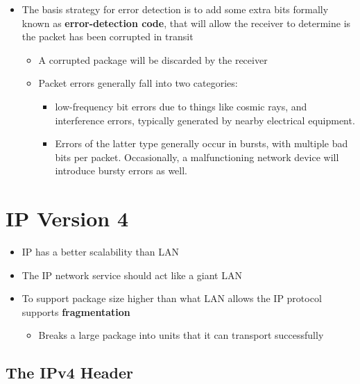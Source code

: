 \documentclass[11pt]{article}
\providecommand{\tightlist}{%
      \setlength{\itemsep}{0pt}\setlength{\parskip}{0pt}}
\begin{document}
\begin{itemize}
\tightlist
\item
  The basis strategy for error detection is to add some extra bits
  formally known as \textbf{error-detection code}, that will allow the
  receiver to determine is the packet has been corrupted in transit

  \begin{itemize}
  \tightlist
  \item
    A corrupted package will be discarded by the receiver
  \item
    Packet errors generally fall into two categories:

    \begin{itemize}
    \tightlist
    \item
      low-frequency bit errors due to things like cosmic rays, and
      interference errors, typically generated by nearby electrical
      equipment.
    \item
      Errors of the latter type generally occur in bursts, with multiple
      bad bits per packet. Occasionally, a malfunctioning network device
      will introduce bursty errors as well.
    \end{itemize}
  \end{itemize}
\end{itemize}

    \section{IP Version 4}\label{ip-version-4}

\begin{itemize}
\tightlist
\item
  IP has a better scalability than LAN
\item
  The IP network service should act like a giant LAN
\item
  To support package size higher than what LAN allows the IP protocol
  supports \textbf{fragmentation}

  \begin{itemize}
  \tightlist
  \item
    Breaks a large package into units that it can transport successfully
  \end{itemize}
\end{itemize}

    \subsection{The IPv4 Header}\label{the-ipv4-header}
\end{document}
